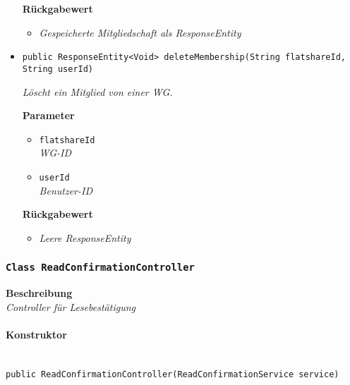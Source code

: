 \begin{itemize}
     	\textbf{Rückgabewert}
     	\begin{itemize}
     		\item\textit{Gespeicherte Mitgliedschaft als ResponseEntity}
     	\end{itemize}
     
     \item{\texttt{public ResponseEntity<Void> deleteMembership(String flatshareId, String userId)}}
     	
     	\textit{Löscht ein Mitglied von einer WG.}
     	
     	\textbf{Parameter}
     	\begin{itemize}
     		\item\texttt{flatshareId}\\
     		\textit{WG-ID}
     		\item\texttt{userId}\\
     		\textit{Benutzer-ID}  
     	\end{itemize}
     	
     	\textbf{Rückgabewert}
     	\begin{itemize}
     		\item\textit{Leere ResponseEntity}
     	\end{itemize}
     \end{itemize}
 
     \subsubsection{\texttt{Class ReadConfirmationController}}
     \textbf{Beschreibung} \\
     \textit{Controller für Lesebestätigung}
     \paragraph*{Konstruktor}\mbox{} \\
     \texttt{public ReadConfirmationController(ReadConfirmationService service)}
